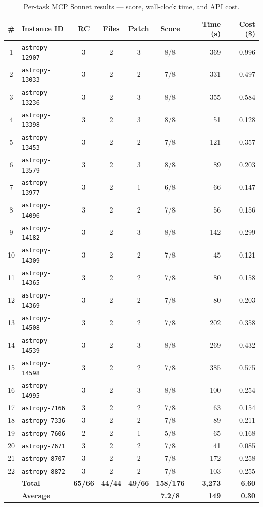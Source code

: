 \begin{table}[h]
\centering
\small
\caption{Per-task MCP Sonnet results --- score, wall-clock time, and API cost.}\label{tab:per-task-mcp-sonnet}
\setlength{\tabcolsep}{4pt}
\begin{tabular}{clccccrr}
\toprule
\textbf{\#} & \textbf{Instance ID} & \textbf{RC} & \textbf{Files} & \textbf{Patch} & \textbf{Score} & \textbf{Time (s)} & \textbf{Cost (\$)} \\
\midrule
 1 & \texttt{astropy-12907} & 3 & 2 & 3 & 8/8 &   369 & 0.996 \\
 2 & \texttt{astropy-13033} & 3 & 2 & 2 & 7/8 &   331 & 0.497 \\
 3 & \texttt{astropy-13236} & 3 & 2 & 3 & 8/8 &   355 & 0.584 \\
 4 & \texttt{astropy-13398} & 3 & 2 & 3 & 8/8 &    51 & 0.128 \\
 5 & \texttt{astropy-13453} & 3 & 2 & 2 & 7/8 &   121 & 0.357 \\
 6 & \texttt{astropy-13579} & 3 & 2 & 3 & 8/8 &    89 & 0.203 \\
 7 & \texttt{astropy-13977} & 3 & 2 & 1 & 6/8 &    66 & 0.147 \\
 8 & \texttt{astropy-14096} & 3 & 2 & 2 & 7/8 &    56 & 0.156 \\
 9 & \texttt{astropy-14182} & 3 & 2 & 3 & 8/8 &   142 & 0.299 \\
10 & \texttt{astropy-14309} & 3 & 2 & 2 & 7/8 &    45 & 0.121 \\
11 & \texttt{astropy-14365} & 3 & 2 & 2 & 7/8 &    80 & 0.158 \\
12 & \texttt{astropy-14369} & 3 & 2 & 2 & 7/8 &    80 & 0.203 \\
13 & \texttt{astropy-14508} & 3 & 2 & 2 & 7/8 &   202 & 0.358 \\
14 & \texttt{astropy-14539} & 3 & 2 & 3 & 8/8 &   269 & 0.432 \\
15 & \texttt{astropy-14598} & 3 & 2 & 2 & 7/8 &   385 & 0.575 \\
16 & \texttt{astropy-14995} & 3 & 2 & 3 & 8/8 &   100 & 0.254 \\
17 & \texttt{astropy-7166}  & 3 & 2 & 2 & 7/8 &    63 & 0.154 \\
18 & \texttt{astropy-7336}  & 3 & 2 & 2 & 7/8 &    89 & 0.211 \\
19 & \texttt{astropy-7606}  & 2 & 2 & 1 & 5/8 &    65 & 0.168 \\
20 & \texttt{astropy-7671}  & 3 & 2 & 2 & 7/8 &    41 & 0.085 \\
21 & \texttt{astropy-8707}  & 3 & 2 & 2 & 7/8 &   172 & 0.258 \\
22 & \texttt{astropy-8872}  & 3 & 2 & 2 & 7/8 &   103 & 0.255 \\
\midrule
   & \textbf{Total}  & \textbf{65/66} & \textbf{44/44} & \textbf{49/66} & \textbf{158/176} & \textbf{3{,}273} & \textbf{6.60} \\
   & \textbf{Average} &       &       &       & \textbf{7.2/8}   & \textbf{149} & \textbf{0.30} \\
\bottomrule
\end{tabular}
\end{table}

